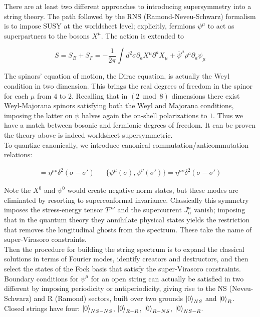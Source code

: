 \documentclass[11pt,a4paper,oneside,openright,titlepage]{book}
\begin{document}
There are at least two different approaches to introducing supersymmetry into a string theory. The path followed by the RNS (Ramond-Neveu-Schwarz) formalism is to impose SUSY at the worldsheet level; explicitly, fermions $\psi^\mu$ to act as superpartners to the bosons $X^\mu$. The action is extended to

\begin{equation}
	S = S_B + S_F = -\frac{1}{2\pi} \int d^2\sigma \partial_a X^\mu \partial^a X_\mu + \bar \psi^\mu \rho^a \partial_a \psi_\mu
\end{equation}

The spinors' equation of motion, the Dirac equation, is actually the Weyl condition in two dimension. This brings the real degrees of freedom in the spinor for each $\mu$ from $4$ to $2$. Recalling that in $(2\bmod 8)$ dimensions there exist Weyl-Majorana spinors satisfying both the Weyl and Majorana conditions, imposing the latter on $\psi$ halves again the on-shell polarizations to $1$. Thus we have a match between bosonic and fermionic degrees of freedom. It can be proven the theory above is indeed worldsheet supersymmetric.\\

To quantize canonically, we introduce canonical commutation/anticommutation relations:

\begin{align}
	[X^\mu(\sigma),X^\nu(\sigma')] = \eta^{\mu\nu} \delta^2(\sigma-\sigma') && \{\psi^\mu(\sigma),\psi^\nu(\sigma')\} = \eta^{\mu\nu} \delta^2(\sigma-\sigma')
\end{align}

Note the $X^0$ and $\psi^0$ would create negative norm states, but these modes are eliminated by resorting to superconformal invariance. Classically this symmetry imposes the stress-energy tensor $T^{\mu\nu}$ and the supercurrent $J^a_\alpha$ vanish; imposing that in the quantum theory they annihilate physical states yields the restriction that removes the longitudinal ghosts from the spectrum. These take the name of super-Virasoro constraints.\\

Then the procedure for building the string spectrum is to expand the classical solutions in terms of Fourier modes, identify creators and destructors, and then select the states of the Fock basis that satisfy the super-Virasoro constraints.\\

Boundary conditions for $\psi^\mu$ for an open string can actually be satisfied in two different by imposing periodicity or antiperiodicity, giving rise to the NS (Neveu-Schwarz) and R (Ramond) sectors, built over two grounds $\ket{0}_{NS}$ and $\ket{0}_R$. Closed strings have four: $\ket{0}_{NS-NS}$, $\ket{0}_{R-R}$, $\ket{0}_{R-NS}$, $\ket{0}_{NS-R}$.
\end{document}
